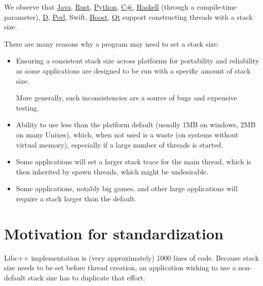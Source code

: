 \documentclass{wg21}
\begin{document}
We observe that \href{https://docs.oracle.com/javase/7/docs/api/java/lang/Thread.html#Thread()}{Java}, \href{https://doc.rust-lang.org/std/thread/struct.Builder.html}{Rust},
\href{https://docs.python.org/3/library/threading.html}{Python}, \href{https://docs.microsoft.com/en-us/dotnet/api/system.threading.thread.-ctor?view=netframework-4.8#System_Threading_Thread__ctor_System_Threading_ParameterizedThreadStart_System_Int32_}{C\#}, \href{https://downloads.haskell.org/~ghc/latest/docs/html/users_guide/runtime_control.html}{Haskell} (through a compile-time parameter), \href{https://dlang.org/phobos/core_thread_osthread.htm}{D}, \href{https://perldoc.perl.org/threads.html#THREAD-STACK-SIZE}{Perl}, Swift,
\href{https://www.boost.org/doc/libs/1_72_0/doc/html/thread/thread_management.html#thread.thread_management.tutorial.attributes}{Boost},  \href{https://doc.qt.io/qt-5/qthread.html#setStackSize}{Qt}
support constructing threads with a stack size.

There are many reasons why a program may need to set a stack size:
\begin{itemize}
\item Ensuring a consistent stack size across platforms for portability and reliability as some applications are designed to be run with a specific amount of stack size.

More generally, such inconsistencies are a source of bugs and expensive testing.

\item Ability to use less than the platform default (usually 1MB on windows, 2MB on many Unixes), which, when not used is a waste (on systems without virtual memory), especially if a large number of threads is started.
\item Some applications will set a larger stack trace for the main thread, which is then inherited by spawn threads, which might be undesirable.
\item Some applications, notably big games, and other large applications will require a stack larger than the default.
\end{itemize}

\section{Motivation for standardization}

Libc++  implementation is (very approximately) 1000 lines of code.
Because stack size needs to be set before thread creation, an application wishing to use a non-default stack size has to duplicate that effort.
\end{document}

